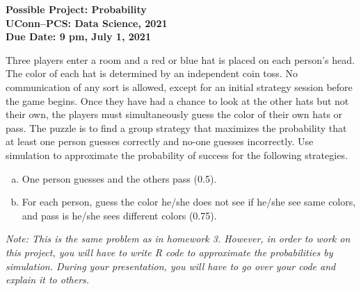 \documentclass[12pt]{article}
\begin{document}
\begin{center}
  \bf Possible Project: Probability\\
  UConn--PCS: Data Science, 2021\\
  Due Date: 9 pm, July 1, 2021
\end{center}

Three players enter a room and a red or blue hat is placed on each
person's head.  The color of each hat is determined by an independent coin
toss. No communication of any sort is allowed, except for an initial strategy
session before the game begins.  Once they have had a chance to look at the
other hats but not their own, the players must simultaneously guess the
color of their own hats or pass. The puzzle is to find a group strategy that
maximizes the probability that at least one person guesses correctly and
no-one guesses incorrectly. Use simulation to approximate the probability of success for the following strategies.
\begin{enumerate}[a.]
\item One person guesses and the others pass (0.5). 
\item For each person, guess the color he/she does
  not see if he/she see same colors, and pass is he/she sees different
  colors (0.75).
\end{enumerate}

{\it Note: This is the same problem as in homework 3. However, in order to work on this project, you will have to write R code to approximate the probabilities by simulation. During your presentation, you will have to go over your code and explain it to others.}
\end{document}
